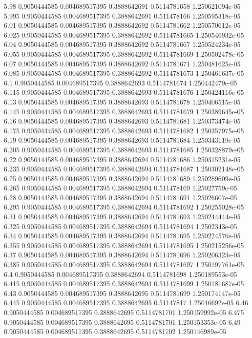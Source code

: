 {5.98 0.9050444585 0.004689517395 0.3888642691 0.5114781658 1.250621094e-05
5.995 0.9050444585 0.004689517395 0.3888642691 0.511478166 1.250595318e-05
6.01 0.9050444585 0.004689517395 0.3888642692 0.5114781662 1.250570612e-05
6.025 0.9050444585 0.004689517395 0.3888642692 0.5114781665 1.250546932e-05
6.04 0.9050444585 0.004689517395 0.3888642692 0.5114781667 1.250524234e-05
6.055 0.9050444585 0.004689517395 0.3888642692 0.5114781669 1.250502478e-05
6.07 0.9050444585 0.004689517395 0.3888642692 0.5114781671 1.250481625e-05
6.085 0.9050444585 0.004689517395 0.3888642692 0.5114781673 1.250461637e-05
6.1 0.9050444585 0.004689517395 0.3888642693 0.5114781674 1.250442479e-05
6.115 0.9050444585 0.004689517395 0.3888642693 0.5114781676 1.250424116e-05
6.13 0.9050444585 0.004689517395 0.3888642693 0.5114781678 1.250406515e-05
6.145 0.9050444585 0.004689517395 0.3888642693 0.5114781679 1.250389645e-05
6.16 0.9050444585 0.004689517395 0.3888642693 0.5114781681 1.250373474e-05
6.175 0.9050444585 0.004689517395 0.3888642693 0.5114781682 1.250357975e-05
6.19 0.9050444585 0.004689517395 0.3888642693 0.5114781684 1.250343119e-05
6.205 0.9050444585 0.004689517395 0.3888642693 0.5114781685 1.250328879e-05
6.22 0.9050444585 0.004689517395 0.3888642694 0.5114781686 1.250315231e-05
6.235 0.9050444585 0.004689517395 0.3888642694 0.5114781687 1.250302148e-05
6.25 0.9050444585 0.004689517395 0.3888642694 0.5114781689 1.250289609e-05
6.265 0.9050444585 0.004689517395 0.3888642694 0.511478169 1.25027759e-05
6.28 0.9050444585 0.004689517395 0.3888642694 0.5114781691 1.25026607e-05
6.295 0.9050444585 0.004689517395 0.3888642694 0.5114781692 1.250255028e-05
6.31 0.9050444585 0.004689517395 0.3888642694 0.5114781693 1.250244444e-05
6.325 0.9050444585 0.004689517395 0.3888642694 0.5114781694 1.2502343e-05
6.34 0.9050444585 0.004689517395 0.3888642694 0.5114781695 1.250224576e-05
6.355 0.9050444585 0.004689517395 0.3888642694 0.5114781695 1.250215256e-05
6.37 0.9050444585 0.004689517395 0.3888642694 0.5114781696 1.250206323e-05
6.385 0.9050444585 0.004689517395 0.3888642694 0.5114781697 1.250197761e-05
6.4 0.9050444585 0.004689517395 0.3888642694 0.5114781698 1.250189553e-05
6.415 0.9050444585 0.004689517395 0.3888642694 0.5114781699 1.250181687e-05
6.43 0.9050444585 0.004689517395 0.3888642695 0.5114781699 1.250174147e-05
6.445 0.9050444585 0.004689517395 0.3888642695 0.51147817 1.25016692e-05
6.46 0.9050444585 0.004689517395 0.3888642695 0.5114781701 1.250159992e-05
6.475 0.9050444585 0.004689517395 0.3888642695 0.5114781701 1.250153353e-05
6.49 0.9050444585 0.004689517395 0.3888642695 0.5114781702 1.250146989e-05
}
